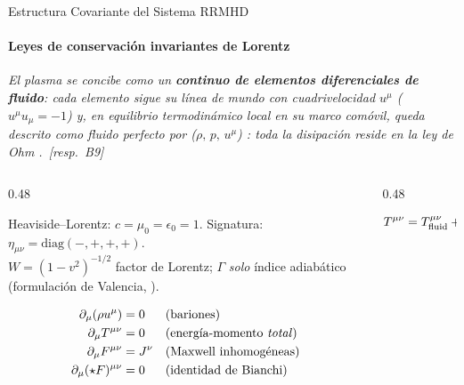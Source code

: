 \documentclass[aspectratio=169,9pt]{beamer}
\begin{document}
\begin{frame}{Estructura Covariante del Sistema RRMHD}
\framesubtitle{Leyes de conservaci\'on invariantes de Lorentz}
{\scriptsize\color{INF3}\itshape El plasma se concibe como un \textbf{continuo de
 elementos diferenciales de fluido}: cada elemento sigue su l\'inea de mundo con
 cuadrivelocidad $u^\mu$ ($u^\mu u_\mu=-1$) y, en equilibrio termodin\'amico local
 en su marco com\'ovil, queda descrito como \emph{fluido perfecto} por
 ($\rho,\,p,\,u^\mu$) \citep{rezzolla-2013}: toda la disipaci\'on reside en la ley
 de Ohm \citep{komissarov-2007}.~{\tiny[resp.\ B9]}\par}
\vspace{0.10cm}
\begin{columns}[T]
\begin{column}{0.48\textwidth}
  \begin{tcolorbox}[RES={Convenciones (v\'alidas en TODA la presentaci\'on)}]
    \scriptsize
    Heaviside--Lorentz: $c=\mu_0=\epsilon_0=1$.\quad
    Signatura: $\eta_{\mu\nu}=\mathrm{diag}(-,+,+,+)$.\\
    $W=(1-v^2)^{-1/2}$ factor de Lorentz;\quad
    $\Gamma$ \emph{solo} \'indice adiab\'atico
    (formulaci\'on de Valencia, \citealp{rezzolla-2013}).
  \end{tcolorbox}
  \pause\vspace{0.1cm}
  \begin{tcolorbox}[EQ={Sistema covariante}]
    \scriptsize
    \begin{align*}
      \partial_\mu(\rho u^\mu) &= 0 && \text{(bariones)}\\
      \partial_\mu T^{\mu\nu} &= 0 && \text{(energ\'ia-momento \emph{total})}\\
      \partial_\mu F^{\mu\nu} &= J^\nu && \text{(Maxwell inhomog\'eneas)}\\
      \partial_\mu(\star F)^{\mu\nu} &= 0 && \text{(identidad de Bianchi)}
    \end{align*}
  \end{tcolorbox}
\end{column}
\begin{column}{0.48\textwidth}
  \pause
  \begin{tcolorbox}[EQ={Tensor de energ\'ia-momento total}]
    \scriptsize
    \begin{align*}
      T^{\mu\nu} &= T^{\mu\nu}_{\rm fluid}+T^{\mu\nu}_{\rm em}\\[2pt]

\end{align*}
\end{tcolorbox}
\end{column}
\end{columns}
\end{frame}
\end{document}
